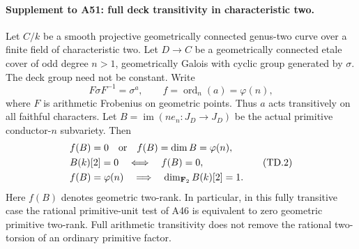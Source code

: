 \paragraph{Supplement to A51: full deck transitivity in characteristic two.}
Let $C/k$ be a smooth projective geometrically connected genus-two
curve over a finite field of characteristic two. Let $D\to C$ be
a geometrically connected etale cover of odd degree $n>1$,
geometrically Galois with cyclic group generated by $\sigma$.
The deck group need not be constant. Write
\[
 F\sigma F^{-1}=\sigma^a,\qquad
 f=\operatorname{ord}_n(a)=\varphi(n),
 \tag{TD.1}
\]
where $F$ is arithmetic Frobenius on geometric points.
Thus $a$ acts transitively on all faithful characters.
Let $B=\operatorname{im}(ne_n:J_D\to J_D)$ be the actual
primitive conductor-$n$ subvariety. Then
\[
\begin{aligned}
 &f(B)=0\quad\hbox{or}\quad f(B)=\dim B=\varphi(n),\\
 &B(k)[2]=0\quad\Longleftrightarrow\quad f(B)=0,\\
 &f(B)=\varphi(n)\quad\Longrightarrow\quad
                         \dim_{\mathbf F_2}B(k)[2]=1.
\end{aligned}
 \tag{TD.2}
\]
Here $f(B)$ denotes geometric two-rank. In particular, in this
fully transitive case the rational primitive-unit test of A46
is equivalent to zero geometric primitive two-rank. Full
arithmetic transitivity does not remove the rational two-torsion
of an ordinary primitive factor.

